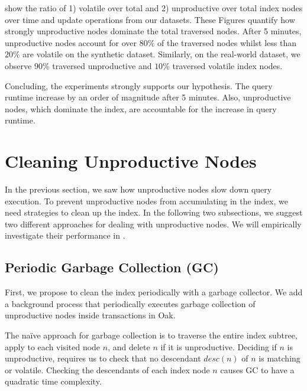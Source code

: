 \documentclass[abstracton,12pt]{scrartcl}
\theoremstyle{definition}
\begin{document}
show the ratio of 1) volatile over total and 2) unproductive over total index nodes
over time and update operations from our datasets. These Figures quantify how
strongly unproductive nodes dominate the total traversed nodes. After 5 minutes,
unproductive nodes account for over $80\%$ of the traversed nodes whilst
less than $20\%$ are volatile on the synthetic dataset.
Similarly, on the real-world dataset, we observe $90\%$ traversed unproductive and $10\%$
traversed volatile index nodes.

Concluding, the experiments strongly supports our hypothesis. The query runtime
increase by an order of magnitude after 5 minutes. Also, unproductive
nodes, which dominate the index, are accountable for the increase in query runtime. 

\newpage

\section{Cleaning Unproductive Nodes}

In the previous section, we saw how unproductive nodes slow down query
execution. To prevent unproductive nodes from accumulating in the index, we
need strategies to clean up the index. In the following two subsections, we suggest two
different approaches for dealing with unproductive nodes. We will empirically
investigate their performance in .

\subsection{Periodic Garbage Collection (GC)}
\label{sec:gc}

First, we propose to clean the index periodically with a garbage collector.
We add a background process that periodically executes
garbage collection of unproductive nodes inside transactions in Oak.

The naïve approach for garbage collection is to traverse the entire index subtree,
apply  to each visited node $n$, and delete $n$ if it
is unproductive. Deciding if $n$ is unproductive, requires us to check that no
descendant $desc(n)$ of $n$ is matching or volatile. Checking the descendants of
each index node $n$ causes GC to have a quadratic time complexity.
\end{document}
